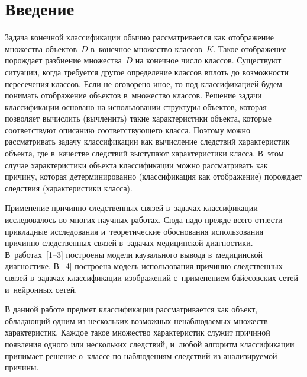 \begin{multicols}{2}

\label{st\stat}
  
  
  \section{Введение}
  
\vspace*{-3pt}
  
  Задача конечной классификации обычно рас\-смат\-ри\-ва\-ет\-ся как отобра\-же\-ние 
множества объектов~$D$ в~конечное множество классов~$K$. Такое отобра\-же\-ние 
порождает разбиение множества~$D$ на конечное чис\-ло классов. Существуют 
ситуации, когда требуется другое определение классов вплоть до воз\-мож\-ности 
пересечения классов. Если не оговорено иное, то под классификацией будем 
понимать отобра\-же\-ние объектов в~множество классов. Решение задачи 
классификации основано на использовании структуры объектов, которая 
поз\-во\-ля\-ет вы\-чис\-лить (вы\-чле\-нить) такие характеристики объекта, которые 
соответствуют описанию со\-от\-вет\-ст\-ву\-юще\-го класса. Поэтому можно 
рас\-смат\-ри\-вать задачу классификации как вы\-чис\-ле\-ние следствий характеристик 
объекта, где в~качестве следствий вы\-сту\-па\-ют характеристики класса. В~этом 
случае характеристики объекта классификации мож\-но рас\-смат\-ри\-вать как 
причину, которая детерминированно (классификация как отобра\-же\-ние) 
по\-рож\-да\-ет следствия (характеристики класса). 
  
  Применение при\-чин\-но-след\-ст\-вен\-ных связей в~задачах классификации 
исследовалось во многих научных работах. Сюда надо преж\-де всего отнести 
при\-клад\-ные исследования и~тео\-ре\-ти\-че\-ские обосно\-ва\-ния использования  
при\-чин\-но-след\-ст\-вен\-ных связей в~задачах медицинской диаг\-но\-сти\-ки. 
В~работах~[1--3] по\-стро\-ены модели каузального вывода в~медицинской 
диагностике. В~[4] по\-стро\-ена модель использования  
при\-чин\-но-след\-ст\-вен\-ных связей в~задачах классификации изображений 
с~применением байесовских сетей и~нейронных сетей.
  
  В данной работе предмет классификации рас\-смат\-ри\-ва\-ет\-ся как объект, 
об\-ла\-да\-ющий одним из нескольких воз\-мо\-жных ненаблюдаемых множеств 
характеристик. Каж\-дое такое множество характеристик служит причиной 
появления одного или нескольких следствий, и~любой алгоритм классификации 
принимает решение о~классе по наблюдениям следствий из ана\-ли\-зи\-ру\-емой 
причины. 


\end{multicols}
